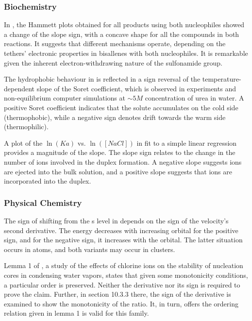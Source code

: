 \documentclass[11pt]{book}
\begin{document}

\subsubsection{Biochemistry}

In \cite{quiros2017nucleophile}, the Hammett plots obtained for all
products using both nucleophiles showed a change of the slope sign,
with a concave shape for all the compounds in both reactions. It suggests
that different mechanisms operate, depending on the tethers' electronic
properties in bisallenes with both nucleophiles. It is remarkable
given the inherent electron-withdrawing nature of the sulfonamide
group.

The hydrophobic behaviour in \cite{niether2018unravelling} is reflected
in a sign reversal of the temperature-dependent slope of the Soret
coefficient, which is observed in experiments and non-equilibrium
computer simulations at $\sim5M$ concentration of urea in water.
A positive Soret coefficient indicates that the solute accumulates
on the cold side (thermophobic), while a negative sign denotes drift
towards the warm side (thermophilic).

A plot of the $\ln\left(Ka\right)$ vs. $\ln\left(\left[NaCl\right]\right)$
in \cite{swenson2021evaluating} fit to a simple linear regression
provides a magnitude of the slope. The slope sign relates to the change
in the number of ions involved in the duplex formation. A negative
slope suggests ions are ejected into the bulk solution, and a positive
slope suggests that ions are incorporated into the duplex.


\subsubsection{Physical Chemistry}

The sign of shifting from the s level in \cite{shpatakovskaya2001quasiclassical}
depends on the sign of the velocity's second derivative. The energy
decreases with increasing orbital for the positive sign, and for the
negative sign, it increases with the orbital. The latter situation
occurs in atoms, and both variants may occur in clusters.

Lemma 1 of \cite{shevkunov2011effect}, a study of the effects of chlorine ions on the stability of nucleation cores in condensing
water vapors, states that given some monotonicity
conditions, a particular order is preserved. Neither the derivative
nor its sign is required to prove the claim. Further, in section 10.3.3
there, the sign of the derivative is examined to show the monotonicity
of the ratio. It, in turn, offers the ordering relation given in lemma
1 is valid for this family.
\end{document}
